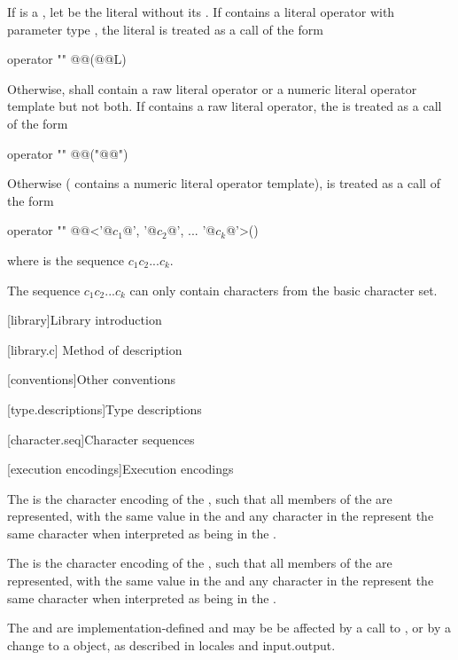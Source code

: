 \documentclass{wg21}
\begin{document}
\pnum
If  is a , let  be the
literal without its . If  contains a literal operator
with parameter type , the literal  is treated as a call of
the form
\begin{codeblock}
    operator "" @@(@@L)
\end{codeblock}
Otherwise,  shall contain a raw literal operator
or a numeric literal operator template but not both.
If  contains a raw literal operator,
the   is treated as a call of the form
\begin{codeblock}
    operator "" @@("@@")
\end{codeblock}
Otherwise ( contains a numeric literal operator template),
 is treated as a call of the form
\begin{codeblock}
    operator "" @@<'@$c_1$@', '@$c_2$@', ... '@$c_k$@'>()
\end{codeblock}
where  is the   sequence $c_1c_2...c_k$.
\begin{note}
    The sequence
    $c_1c_2...c_k$ can only contain characters from the basic  character set.
\end{note}


[library]{Library introduction}

[library.c]{ Method of description}

[conventions]{Other conventions}

[type.descriptions]{Type descriptions}

[character.seq]{Character sequences}


\begin{addedblock}
[execution encodings]{Execution encodings}

The  is the character encoding of the , such that
all members of the  are represented, with the same value in the  and any character
in the  represent the same character when interpreted as being in the .

The  is the character encoding of the , such that
all members of the  are represented, with the same value in the  and any character
in the  represent the same character when interpreted as being in the .

The  and  are implementation-defined and may be be affected by a call to , or by a change to a  object, as described in locales and input.output.

\end{addedblock}
\end{document}
